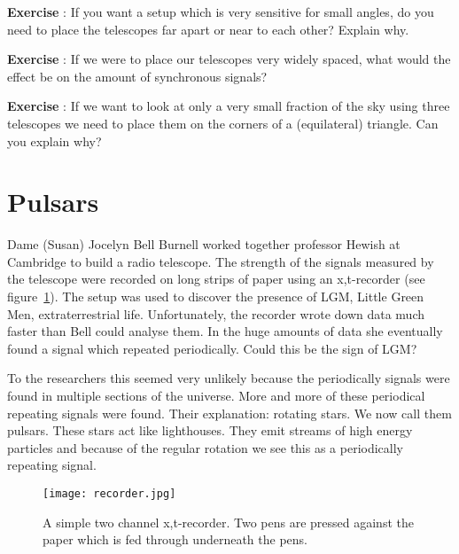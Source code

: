 \begin{shaded}
\textbf{Exercise \theExercise {}} : If you want a setup which is very sensitive for small angles, do you need to place the telescopes far apart or near to each other? Explain why.\end{shaded}
\begin{shaded}
\textbf{Exercise \theExercise {}} : If we were to place our telescopes very widely spaced, what would the effect be on the amount of synchronous signals?\end{shaded}
\begin{shaded}
\textbf{Exercise \theExercise {}} : If we want to look at only a very small fraction of the sky using three telescopes we need to place them on the corners of a (equilateral) triangle. Can you explain why?\end{shaded}

\section{Pulsars}
Dame (Susan) Jocelyn Bell Burnell worked together professor Hewish at Cambridge to build a radio telescope. The strength of the signals measured by the telescope were recorded on long strips of paper using an x,t-recorder (see figure~\ref{fig:recorder}). The setup was used to discover the presence of LGM, Little Green Men, extraterrestrial life. Unfortunately, the recorder wrote down data much faster than Bell could analyse them. In the huge amounts of data she eventually found a signal which repeated periodically. Could this be the sign of LGM?

To the researchers this seemed very unlikely because the periodically signals were found in multiple sections of the universe. More and more of these periodical repeating signals were found. Their explanation: rotating stars. We now call them pulsars. These stars act like lighthouses. They emit streams of high energy particles and because of the regular rotation we see this as a periodically repeating signal.

\begin{figure}[h]\begin{center}
\texttt{[image: recorder.jpg]}%
\caption{A simple two channel x,t-recorder. Two pens are pressed against the paper which is fed through underneath the pens.}\label{fig:recorder}
\end{center}\end{figure}

